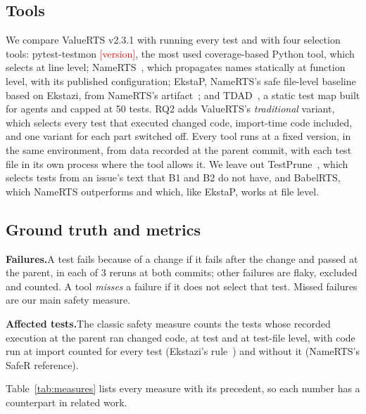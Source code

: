 \documentclass[acmsmall,screen,review,anonymous]{acmart}
\newcommand{\ph}[1]{\textcolor{red}{[#1]}}
\newcommand{\tool}{ValueRTS\xspace}
\newcommand{\para}[1]{\smallskip\noindent\textbf{#1}\hspace{0.4em}}
\begin{document}
\subsection{Tools}
We compare \tool v2.3.1 with running every test and with four selection tools: pytest-testmon \ph{version}, the most used coverage-based Python tool, which selects at line level; NameRTS~\cite{wang2026namerts}, which propagates names statically at function level, with its published configuration; EkstaP, NameRTS's safe file-level baseline based on Ekstazi, from NameRTS's artifact~\cite{wang2026namerts}; and TDAD~\cite{alonso2026tdad}, a static test map built for agents and capped at 50 tests. RQ2 adds \tool's \emph{traditional} variant, which selects every test that executed changed code, import-time code included, and one variant for each part switched off. Every tool runs at a fixed version, in the same environment, from data recorded at the parent commit, with each test file in its own process where the tool allows it. We leave out TestPrune~\cite{chen2026oldtests}, which selects tests from an issue's text that B1 and B2 do not have, and BabelRTS, which NameRTS outperforms and which, like EkstaP, works at file level.


\subsection{Ground truth and metrics}
\para{Failures.}A test fails because of a change if it fails after the change and passed at the parent, in each of 3 reruns at both commits; other failures are flaky, excluded and counted. A tool \emph{misses} a failure if it does not select that test. Missed failures are our main safety measure.

\para{Affected tests.}The classic safety measure counts the tests whose recorded execution at the parent ran changed code, at test and at test-file level, with code run at import counted for every test (Ekstazi's rule~\cite{gligoric2015ekstazi}) and without it (NameRTS's SafeR reference).

Table~\ref{tab:measures} lists every measure with its precedent, so each number has a counterpart in related work.
\end{document}
